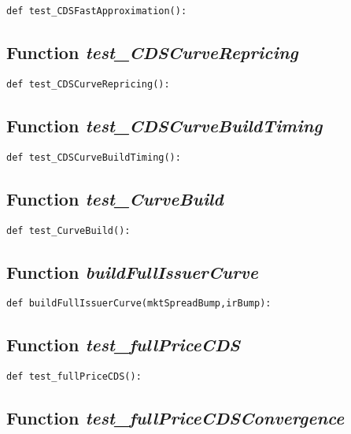 \documentclass[twoside,11pt]{book}
\begin{document}
\begin{lstlisting}
def test_CDSFastApproximation():
\end{lstlisting}

\subsection{Function {\it test\_CDSCurveRepricing}}


\begin{lstlisting}
def test_CDSCurveRepricing():
\end{lstlisting}

\subsection{Function {\it test\_CDSCurveBuildTiming}}


\begin{lstlisting}
def test_CDSCurveBuildTiming():
\end{lstlisting}

\subsection{Function {\it test\_CurveBuild}}


\begin{lstlisting}
def test_CurveBuild():
\end{lstlisting}

\subsection{Function {\it buildFullIssuerCurve}}


\begin{lstlisting}
def buildFullIssuerCurve(mktSpreadBump,irBump):
\end{lstlisting}

\subsection{Function {\it test\_fullPriceCDS}}


\begin{lstlisting}
def test_fullPriceCDS():
\end{lstlisting}

\subsection{Function {\it test\_fullPriceCDSConvergence}}
\end{document}
